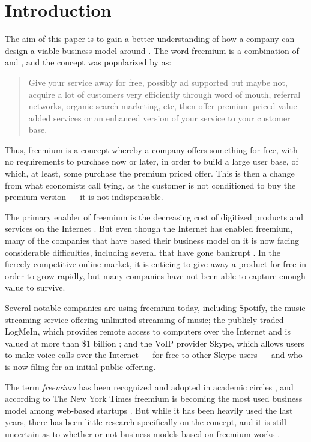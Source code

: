\chapter{Introduction}
\label{chapter:introduction}

The aim of this paper is to gain a better understanding of how a company can design a viable business
model around . The word freemium is a combination of  and , and the concept was popularized by \citet{wilson2006} as:

\begin{quote}
Give your service away for free, possibly ad supported but maybe not, acquire a lot of customers very efficiently through word of mouth, referral networks, organic search marketing, etc, then offer premium priced value added services or an enhanced version of your service to your customer base.
\end{quote}

Thus, freemium is a concept whereby a company offers something for free, with no requirements to purchase now or later, in order to build a large user base, of which, at least, some purchase the premium priced offer. This is then a change from what economists call tying, as the customer is not conditioned to buy the premium version --- it is not indispensable.

The primary enabler of freemium is the decreasing cost of digitized products and services on the Internet \citep{anderson2009}. But even though the Internet has enabled freemium, many of the companies that have based their business model on it is now facing considerable difficulties, including several that have gone bankrupt  \citep{darlin2009}. In the fiercely competitive online market, it is enticing to give away a product for free in order to grow rapidly, but many companies have not been able to capture enough value to survive.

Several notable companies are using freemium today, including Spotify, the music streaming service offering unlimited streaming of music; the publicly traded LogMeIn, which provides remote access to computers over the Internet and is valued at more than \$1 billion ; and the VoIP provider Skype, which allows users to make voice calls over the Internet --- for free to other Skype users --- and who is now filing for an initial public offering.

The term \emph{freemium} has been recognized and adopted in academic circles \citep[\eg][]{doerr2010,shuen2008,teece2010,osterwalder2010}, and according to The New York Times freemium is becoming the most used business model among web-based startups \citep{miller2009}. But while it has been heavily used the last years, there has been little research specifically on the concept, and it is still uncertain as to whether or not business models based on freemium works \citep{teece2010}.

